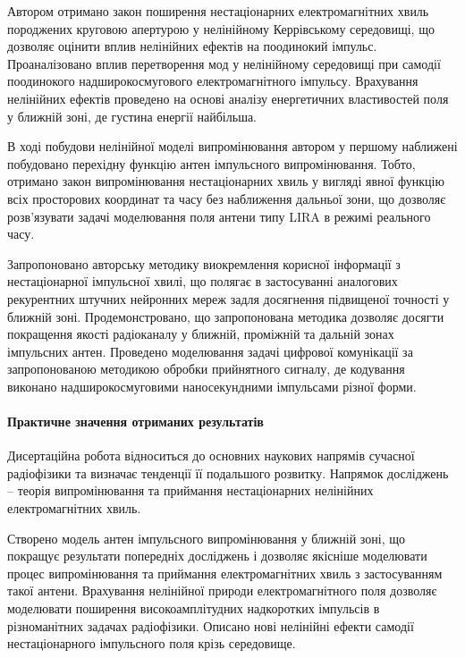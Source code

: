Автором отримано закон поширення нестаціонарних електромагнітних 
хвиль породжених круговою апертурою у нелінійному Керрівському 
середовищі, що дозволяє оцінити вплив нелінійних ефектів на поодинокий 
імпульс. Проаналізовано вплив перетворення мод у нелінійному середовищі 
при самодії поодинокого надширокосмугового електромагнітного імпульсу. 
Врахування нелінійних ефектів проведено на основі аналізу енергетичних 
властивостей поля у ближній зоні, де густина енергії найбільша.

В ході побудови нелінійної моделі випромінювання автором у першому 
наближені побудовано перехідну функцію антен імпульсного випромінювання. 
Тобто, отримано закон випромінювання нестаціонарних хвиль у вигляді 
явної функцію всіх просторових координат та часу без наближення 
дальньої зони, що дозволяє розв’язувати задачі моделювання поля антени 
типу LIRA в режимі реального часу.

Запропоновано авторську методику виокремлення корисної інформації з 
нестаціонарної імпульсної хвилі, що полягає в застосуванні аналогових 
рекурентних штучних нейронних мереж задля досягнення підвищеної точності 
у ближній зоні. Продемонстровано, що запропонована методика дозволяє 
досягти покращення якості радіоканалу у ближній, проміжній та дальній 
зонах імпульсних антен. Проведено моделювання задачі цифрової 
комунікації за запропонованою методикою обробки прийнятного 
сигналу, де кодування виконано надширокосмуговими наносекундними 
імпульсами різної форми.

\paragraph{Практичне значення отриманих результатів}

Дисертаційна робота відноситься до основних наукових напрямів сучасної 
радіофізики та визначає тенденції її подальшого розвитку. Напрямок
досліджень -- теорія випромінювання та приймання нестаціонарних 
нелінійних електромагнітних хвиль.

Створено модель антен імпульсного випромінювання у ближній зоні, що 
покращує результати попередніх досліджень і дозволяє якісніше моделювати 
процес випромінювання та приймання електромагнітних хвиль з застосуванням 
такої антени. Врахування нелінійної природи електромагнітного поля дозволяє
моделювати поширення високоамплітудних надкоротких імпульсів в різноманітних
задачах радіофізики. Описано нові нелінійні ефекти самодії нестаціонарного 
імпульсного поля крізь середовище.

